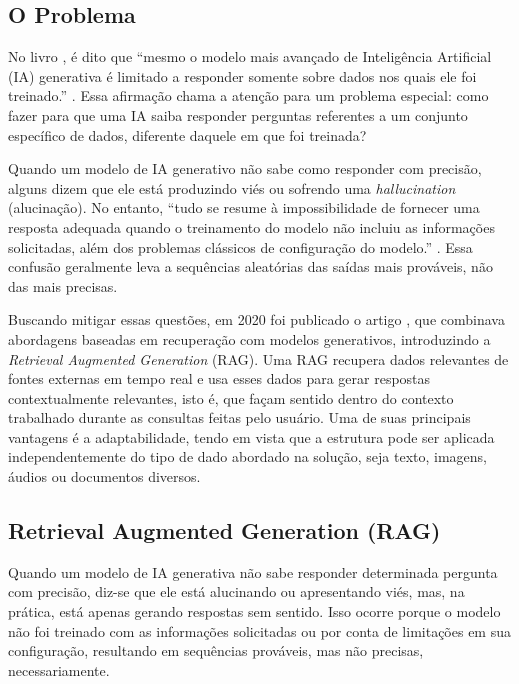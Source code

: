 \documentclass[a4paper, 12pt]{article}
\newcommand{\citeb}[1]{\bibleftbracket\cite{#1}\bibrightbracket}
\begin{document}
    
    \subsection{O Problema}

    No livro , é dito que ``mesmo o modelo mais avançado de Inteligência Artificial (IA) generativa é limitado a responder somente sobre dados nos quais ele foi treinado.'' \citeb{rothman}. Essa afirmação chama a atenção para um problema especial: como fazer para que uma IA saiba responder perguntas referentes a um conjunto específico de dados, diferente daquele em que foi treinada?

    Quando um modelo de IA generativo não sabe como responder com precisão, alguns dizem que ele está produzindo viés ou sofrendo uma \textit{hallucination} (alucinação). No entanto, ``tudo se resume à impossibilidade de fornecer uma resposta adequada quando o treinamento do modelo não incluiu as informações solicitadas, além dos problemas clássicos de configuração do modelo.'' \citeb{rothman}. Essa confusão geralmente leva a sequências aleatórias das saídas mais prováveis, não das mais precisas.

    Buscando mitigar essas questões, em 2020 foi publicado o artigo  \citeb{RAG}, que combinava abordagens baseadas em recuperação com modelos generativos, introduzindo a \textit{Retrieval Augmented Generation} (RAG). Uma RAG recupera dados relevantes de fontes externas em tempo real e usa esses dados para gerar respostas contextualmente relevantes, isto é, que façam sentido dentro do contexto trabalhado durante as consultas feitas pelo usuário. Uma de suas principais vantagens é a adaptabilidade, tendo em vista que a estrutura pode ser aplicada independentemente do tipo de dado abordado na solução, seja texto, imagens, áudios ou documentos diversos.


    \subsection{Retrieval Augmented Generation (RAG)}
    
    Quando um modelo de IA generativa não sabe responder determinada pergunta com precisão, diz-se que ele está alucinando ou apresentando viés, mas, na prática, está apenas gerando respostas sem sentido. Isso ocorre porque o modelo não foi treinado com as informações solicitadas ou por conta de limitações em sua configuração, resultando em sequências prováveis, mas não precisas, necessariamente.
\end{document}

